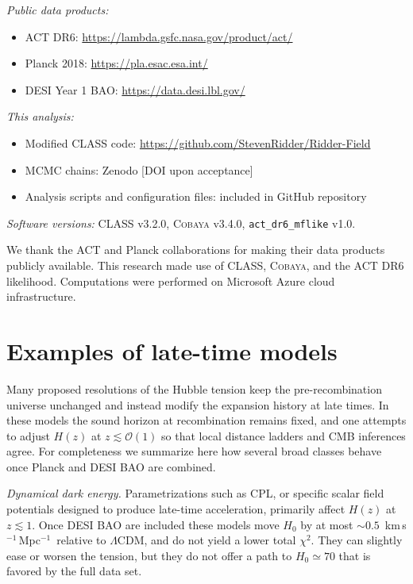 \documentclass[twocolumn,showpacs,preprintnumbers,amsmath,amssymb,prd]{revtex4-2}
\newcommand{\lcdm}{$\Lambda$CDM}
\newcommand{\kms}{km\,s$^{-1}$\,Mpc$^{-1}$}
\begin{document}
\emph{Public data products:}
\begin{itemize}
\item ACT DR6: \url{https://lambda.gsfc.nasa.gov/product/act/}
\item Planck 2018: \url{https://pla.esac.esa.int/}
\item DESI Year 1 BAO: \url{https://data.desi.lbl.gov/}
\end{itemize}

\emph{This analysis:}
\begin{itemize}
\item Modified \textsc{CLASS} code: \url{https://github.com/StevenRidder/Ridder-Field}
\item MCMC chains: Zenodo [DOI upon acceptance]
\item Analysis scripts and configuration files: included in GitHub repository
\end{itemize}

\emph{Software versions:} \textsc{CLASS} v3.2.0, \textsc{Cobaya} v3.4.0, 
\texttt{act\_dr6\_mflike} v1.0.

\begin{acknowledgments}
We thank the ACT and Planck collaborations for making their data products 
publicly available. This research made use of \textsc{CLASS}, \textsc{Cobaya}, 
and the ACT DR6 likelihood. Computations were performed on Microsoft Azure 
cloud infrastructure.
\end{acknowledgments}



\appendix

\section{Examples of late-time models}
\label{app:latetime}

Many proposed resolutions of the Hubble tension keep the pre-recombination universe 
unchanged and instead modify the expansion history at late times. In these models 
the sound horizon at recombination remains fixed, and one attempts to adjust $H(z)$ 
at $z \lesssim \mathcal{O}(1)$ so that local distance ladders and CMB inferences agree. 
For completeness we summarize here how several broad classes behave once Planck and 
DESI BAO are combined.

\emph{Dynamical dark energy.} Parametrizations such as CPL, or specific scalar 
field potentials designed to produce late-time acceleration, primarily affect 
$H(z)$ at $z \lesssim 1$. Once DESI BAO 
are included these models move $H_0$ by at most $\sim 0.5$~\kms\ 
relative to \lcdm, and do not yield a lower total $\chi^2$. They can slightly ease 
or worsen the tension, but they do not offer a path to $H_0 \simeq 70$ that is 
favored by the full data set.
\end{document}
